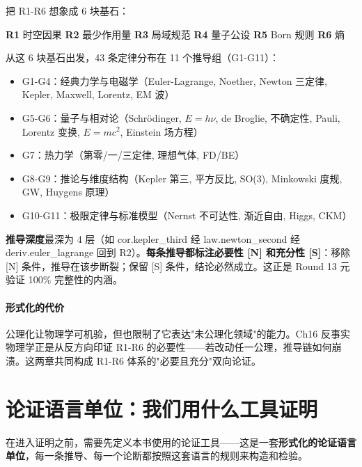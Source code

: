 把 R1-R6 想象成 6 块基石：
\begin{center}
\textbf{R1} 时空因果 \quad \textbf{R2} 最少作用量 \quad \textbf{R3} 局域规范 \quad \textbf{R4} 量子公设 \quad \textbf{R5} Born 规则 \quad \textbf{R6} 熵
\end{center}

从这 6 块基石出发，43 条定律分布在 11 个推导组（G1-G11）：
\begin{itemize}
\item G1-G4：经典力学与电磁学（Euler-Lagrange, Noether, Newton 三定律, Kepler, Maxwell, Lorentz, EM 波）
\item G5-G6：量子与相对论（Schrödinger, $E=h\nu$, de Broglie, 不确定性, Pauli, Lorentz 变换, $E=mc^2$, Einstein 场方程）
\item G7：热力学（第零/一/三定律, 理想气体, FD/BE）
\item G8-G9：推论与维度结构（Kepler 第三, 平方反比, SO(3), Minkowski 度规, GW, Huygens 原理）
\item G10-G11：极限定律与标准模型（Nernst 不可达性, 渐近自由, Higgs, CKM）
\end{itemize}

\textbf{推导深度}最深为 4 层（如 cor.kepler\_third 经 law.newton\_second 经 deriv.euler\_lagrange 回到 R2）。\textbf{每条推导都标注必要性 [N] 和充分性 [S]}：移除 [N] 条件，推导在该步断裂；保留 [S] 条件，结论必然成立。这正是 Round 13 元验证 100\% 完整性的内涵。

\paragraph{形式化的代价} 公理化让物理学可机验，但也限制了它表达"未公理化领域"的能力。Ch16 反事实物理学正是从反方向印证 R1-R6 的必要性——若改动任一公理，推导链如何崩溃。这两章共同构成 R1-R6 体系的"必要且充分"双向论证。

\section{论证语言单位：我们用什么工具证明}

在进入证明之前，需要先定义本书使用的论证工具——这是一套\textbf{形式化的论证语言单位}，每一条推导、每一个论断都按照这套语言的规则来构造和检验。

